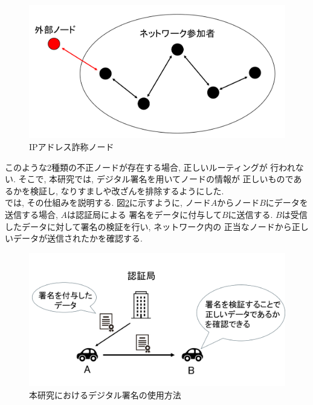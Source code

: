 \begin{figure}
  \centering
  \includegraphics[scale=0.7]{figures/ip-liar.png}
  \caption{IPアドレス詐称ノード}
  \label{fig:ip-liar}
\end{figure}

\indent このような2種類の不正ノードが存在する場合, 正しいルーティングが
行われない. そこで, 本研究では, デジタル署名を用いてノードの情報が
正しいものであるかを検証し, なりすましや改ざんを排除するようにした. \\
\indent では, その仕組みを説明する. 図\ref{fig:signature-method}に示すように, 
ノード$A$からノード$B$にデータを送信する場合, $A$は認証局による
署名をデータに付与して$B$に送信する. 
$B$は受信したデータに対して署名の検証を行い, ネットワーク内の
正当なノードから正しいデータが送信されたかを確認する.
\newpage

\begin{figure}
  \centering
  \includegraphics[scale=0.7]{figures/signature-method.png}
  \caption{本研究におけるデジタル署名の使用方法}
  \label{fig:signature-method}
\end{figure}

